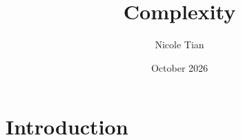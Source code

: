 \documentclass{article}
\title{Complexity}
\author{Nicole Tian}
\date{October 2026}
\begin{document}
\maketitle

\section{Introduction}
\end{document}
